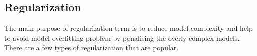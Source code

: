 \subsection{Regularization}

The main purpose of regularization term is to reduce model complexity and help to avoid model overfitting problem by penalising the overly complex models. There are a few types of regularization that are popular. 